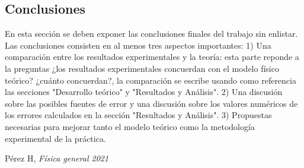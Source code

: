 \documentclass{article}
\begin{document}
\begin{multicols}{2}
\section*{Conclusiones}\label{Conclusiones}				%

En esta sección se deben exponer las conclusiones finales del trabajo sin enlistar. Las conclusiones consisten en al menos tres aspectos importantes: 1) Una comparación entre los resultados experimentales y la teoría: esta parte reponde a la preguntas ¿los resultados experimentales concuerdan con el modelo físico teórico? ¿cuánto concuerdan?, la comparación se escribe usando como referencia las secciones "Desarrollo teórico" y "Resultados y Análisis". 2) Una discusión sobre las posibles fuentes de error y una discusión sobre los valores numéricos de los errores calculados en la sección "Resultados y Análisis". 3) Propuestas necesarias para mejorar tanto el modelo teórico como la metodología experimental de la práctica.


\begin{thebibliography}{9}						%

%
	Pérez H, \emph{Física general 2021}
\end{thebibliography}


\end{multicols}
\end{document}

